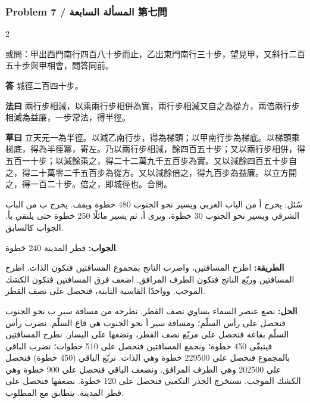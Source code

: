 \documentclass[11pt,a4paper]{article}
\newcommand{\ar}[1]{\arabicfont\beginR #1\endR}
\newcommand{\Answer}[1]{\par\noindent\textbf{\color{problemcolor}答} #1\par}
\newcommand{\Method}[1]{\par\noindent\textbf{\color{problemcolor}法曰} #1\par}
\newcommand{\Workings}[1]{\par\noindent\textbf{\color{problemcolor}草曰} #1\par}
\newcommand{\AnswerAr}{\par\noindent\textbf{\color{problemcolor}\ar{الجواب:}} }
\newcommand{\MethodAr}{\par\noindent\textbf{\color{problemcolor}\ar{الطريقة:}} }
\newcommand{\WorkingsAr}{\par\noindent\textbf{\color{problemcolor}\ar{الحل:}} }
\begin{document}
\vspace{0.5cm}

\subsubsection*{Problem 7 / \ar{المسألة السابعة} \quad 第七問}

\begin{paracol}{2}

\noindent 或問：甲出西門南行四百八十步而止，乙出東門南行三十步，望見甲，又斜行二百五十步與甲相會，問答同前。

\vspace{0.2cm}

\Answer{城徑二百四十步。}

\vspace{0.2cm}

\Method{兩行步相減，以乘兩行步相併為實，兩行步相減又自之為從方，兩倍兩行步相減為益廉，一步常法，得半徑。}

\vspace{0.2cm}

\Workings{立天元一為半徑。以減乙南行步，得為梯頭；以甲南行步為梯底。以梯頭乘梯底，得為半徑冪，寄左。乃以兩行步相減，餘四百五十步；又以兩行步相併，得五百一十步；以減餘乘之，得二十二萬九千五百步為實。又以減餘四百五十步自之，得二十萬零二千五百步為從方。又以減餘倍之，得九百步為益廉。以立方開之，得一百二十步。倍之，即城徑也。合問。}

\switchcolumn

\ar{سُئل: يخرج أ من الباب الغربي ويسير نحو الجنوب 480 خطوة ويقف. يخرج ب من الباب الشرقي ويسير نحو الجنوب 30 خطوة، ويرى أ، ثم يسير مائلًا 250 خطوة حتى يلتقي بأ. الجواب كالسابق.}

\vspace{0.2cm}

\AnswerAr{قطر المدينة 240 خطوة.}

\vspace{0.2cm}

\MethodAr{اطرح المسافتين، واضرب الناتج بمجموع المسافتين فتكون الذات. اطرح المسافتين وربّع الناتج فتكون الطرف المرافق. اضعف فرق المسافتين فتكون الكشك الموجب. وواحدًا القاسية الثابتة، فتحصل على نصف القطر.}

\vspace{0.2cm}

\WorkingsAr{نضع عنصر السماء يساوي نصف القطر. نطرحه من مسافة سير ب نحو الجنوب فنحصل على رأس السلّم؛ ومسافة سير أ نحو الجنوب هي قاع السلّم. نضرب رأس السلّم بقاعه فنحصل على مربّع نصف القطر، ونضعها على اليسار. نطرح المسافتين فيتبقّى 450 خطوة؛ ونجمع المسافتين فنحصل على 510 خطوات؛ نضرب الباقي بالمجموع فنحصل على 229500 خطوة وهي الذات. نربّع الباقي (450 خطوة) فنحصل على 202500 وهي الطرف المرافق. ونضعف الباقي فنحصل على 900 خطوة وهي الكشك الموجب. نستخرج الجذر التكعبي فنحصل على 120 خطوة. نضعفها فنحصل على قطر المدينة. يتطابق مع المطلوب.}

\end{paracol}
\end{document}
